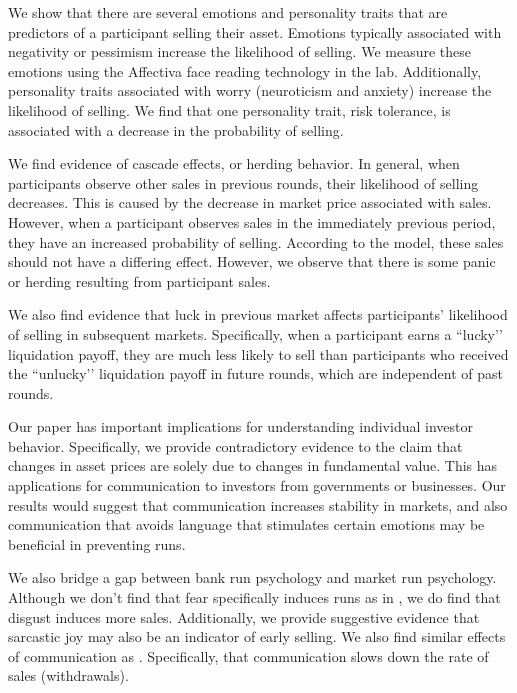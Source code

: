 \documentclass[11pt]{article}
\begin{document}
We show that there are several emotions and personality traits that are predictors of a participant selling their asset. Emotions typically associated with negativity or pessimism increase the likelihood of selling. We measure these emotions using the Affectiva face reading technology in the lab. Additionally, personality traits associated with worry (neuroticism and anxiety) increase the likelihood of selling. We find that one personality trait, risk tolerance, is associated with a decrease in the probability of selling. 

We find evidence of cascade effects, or herding behavior. In general, when participants observe other sales in previous rounds, their likelihood of selling decreases. This is caused by the decrease in market price associated with sales. However, when a participant observes sales in the immediately previous period, they have an increased probability of selling. According to the model, these sales should not have a differing effect. However, we observe that there is some panic or herding resulting from participant sales. 

We also find evidence that luck in previous market affects participants’ likelihood of selling in subsequent markets. Specifically, when a participant earns a ``lucky’’ liquidation payoff, they are much less likely to sell than participants who received the ``unlucky’’ liquidation payoff in future rounds, which are independent of past rounds. 

Our paper has important implications for understanding individual investor behavior. Specifically, we provide contradictory evidence to the claim that changes in asset prices are solely due to changes in fundamental value. This has applications for communication to investors from governments or businesses. Our results would suggest that communication increases stability in markets, and also communication that avoids language that stimulates certain emotions may be beneficial in preventing runs.

We also bridge a gap between bank run psychology and market run psychology. Although we don’t find that fear specifically induces runs as in \cite{dijk2017bank}, we do find that disgust induces more sales. Additionally, we provide suggestive evidence that sarcastic joy may also be an indicator of early selling. We also find similar effects of communication as \cite{shakina2018coordination}. Specifically, that communication slows down the rate of sales (withdrawals). 
\end{document}
